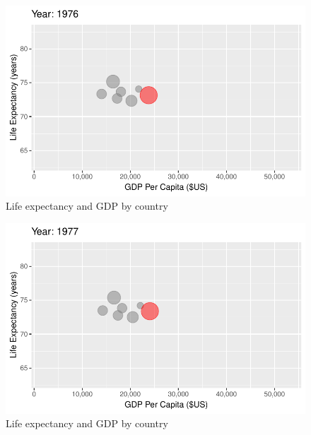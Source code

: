 \documentclass[
  letterpaper,
  DIV=11,
  numbers=noendperiod]{scrreport}
\theoremstyle{definition}
\theoremstyle{remark}
\begin{document}
\begin{figure}

{\centering \includegraphics{index_files/figure-pdf/fig-anim-country-45.pdf}

}

\caption{\label{fig-anim-country-45}Life expectancy and GDP by country}

\end{figure}

\begin{figure}

{\centering \includegraphics{index_files/figure-pdf/fig-anim-country-46.pdf}

}

\caption{\label{fig-anim-country-46}Life expectancy and GDP by country}

\end{figure}
\end{document}
